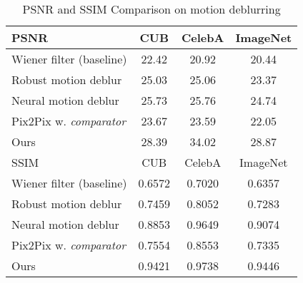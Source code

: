 \documentclass[10pt,twocolumn,letterpaper]{article}
\begin{document}
\begin{table}
\begin{center}
\setlength{\tabcolsep}{3pt}
\begin{tabular}{|l|c|c|c|}
\hline
PSNR & CUB & CelebA & ImageNet \\
\hline
Wiener filter (baseline) & 22.42 & 20.92 & 20.44 \\
Robust motion deblur \cite{xu2010two} & 25.03 & 25.06 & 23.37 \\
Neural motion deblur \cite{chakrabarti2016neural} & 25.73 & 25.76 & 24.74 \\
Pix2Pix \cite{isola2016image} w. \emph{comparator} & 23.67 & 23.59 & 22.05 \\
\hline
Ours & 28.39 & 34.02 & 28.87 \\
\hline
\hline
SSIM & CUB & CelebA & ImageNet \\
\hline
Wiener filter (baseline) & 0.6572 & 0.7020 & 0.6357 \\
Robust motion deblur \cite{xu2010two} & 0.7459 & 0.8052 & 0.7283  \\
Neural motion deblur \cite{chakrabarti2016neural} & 0.8853 & 0.9649 & 0.9074 \\
Pix2Pix \cite{isola2016image} w. \emph{comparator} & 0.7554 & 0.8553 & 0.7335 \\
\hline
Ours & 0.9421  & 0.9738 & 0.9446  \\
\hline
\end{tabular}
\end{center}
\caption{PSNR and SSIM Comparison on motion deblurring}
\label{tab:motion_deblur}
\end{table}
\end{document}
